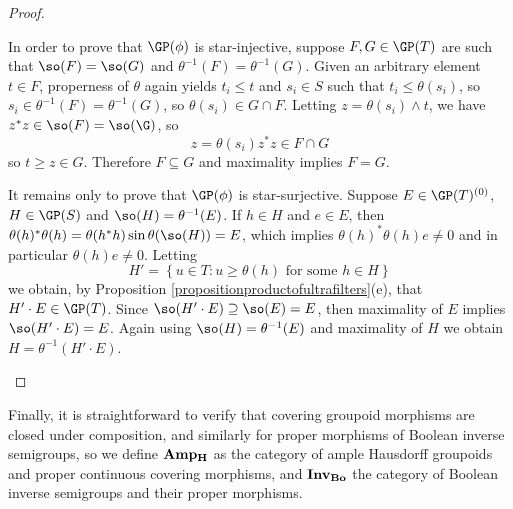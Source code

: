\begin{proof}
\begin{enumerate}
In order to prove that $\GP(\phi)$ is star-injective, suppose $F,G\in\GP(T)$ are such that $\so(F)=\so(G)$ and $\theta^{-1}(F)=\theta^{-1}(G)$. Given an arbitrary element $t\in F$, properness of $\theta$ again yields $t_i\leq t$ and $s_i\in S$ such that $t_i\leq \theta(s_i)$, so $s_i\in\theta^{-1}(F)=\theta^{-1}(G)$, so $\theta(s_i)\in G\cap F$. Letting $z=\theta(s_i)\land t$, we have $z^*z\in\so(F)=\so(\G)$, so
\[z=\theta(s_i)z^*z\in F\cap G\]
so $t\geq z\in G$. Therefore $F\subseteq G$ and maximality implies $F=G$.

It remains only to prove that $\GP(\phi)$ is star-surjective. Suppose $E\in\GP(T)^{(0)}$, $H\in\GP(S)$ and $\so(H)=\theta^{-1}(E)$. If $h\in H$ and $e\in E$, then $\theta(h)^*\theta(h)=\theta(h^*h)\sin\theta(\so(H))=E$, which implies $\theta(h)^*\theta(h)e\neq 0$ and in particular $\theta(h)e\neq 0$. Letting
\[H'=\left\{u\in T:u\geq\theta(h)\text{ for some }h\in H\right\}\]
we obtain, by Proposition \ref{propositionproductofultrafilters}(e), that $H'\cdot E\in\GP(T)$. Since $\so(H'\cdot E)\supseteq\so(E)=E$, then maximality of $E$ implies $\so(H'\cdot E)=E$. Again using $\so(H)=\theta^{-1}(E)$ and maximality of $H$ we obtain $H=\theta^{-1}(H'\cdot E)$.\qedhere
\end{enumerate}
\end{proof}
 
Finally, it is straightforward to verify that covering groupoid morphisms are closed under composition, and similarly for proper morphisms of Boolean inverse semigroups, so we define $\mathrm{\bf Amp_H}$ as the category of ample Hausdorff groupoids and proper continuous covering morphisms, and $\mathrm{\bf Inv_{Bo}}$ the category of Boolean inverse semigroups and their proper morphisms.
 
